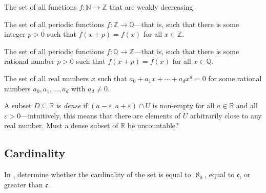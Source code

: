 \begin{chapex}
The set of all functions $f : \mathbb{N} \to \mathbb{Z}$ that are weakly decreasing.
\end{chapex}


\begin{chapex}
The set of all periodic functions $f : \mathbb{Z} \to \mathbb{Q}$---that is, such that there is some integer $p > 0$ such that $f(x+p) = f(x)$ for all $x \in \mathbb{Z}$.
\end{chapex}

\begin{chapex}
The set of all periodic functions $f : \mathbb{Q} \to \mathbb{Z}$---that is, such that there is some rational number $p > 0$ such that $f(x+p) = f(x)$ for all $x \in \mathbb{Q}$.
\end{chapex}

\begin{chapex}
\label{cqDetermineIfCountableEnd}
The set of all real numbers $x$ such that $a_0 + a_1x + \cdots + a_dx^d = 0$ for some rational numbers $a_0,a_1,\dots,a_d$ with $a_d \ne 0$.
\end{chapex}

\begin{chapex}
A subset $D \subseteq \mathbb{R}$ is \textit{dense} if $(a-\varepsilon, a+\varepsilon) \cap U$ is non-empty for all $a \in \mathbb{R}$ and all $\varepsilon > 0$---intuitively, this means that there are elements of $U$ arbitrarily close to any real number. Must a dense subset of $\mathbb{R}$ be uncountable?
\end{chapex}

\subsection*{Cardinality}

In , determine whether the cardinality of the set is equal to $\aleph_0$, equal to $\mathfrak{c}$, or greater than $\mathfrak{c}$.

